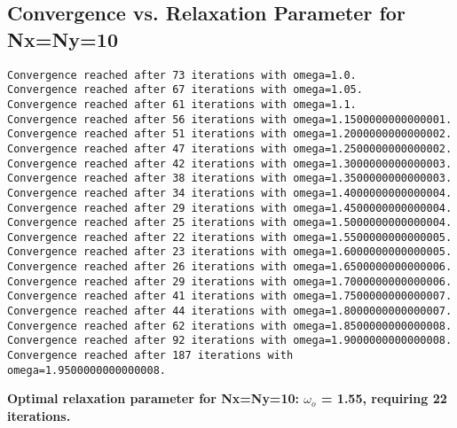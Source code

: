 \documentclass[a4paper, twoside]{article}
\begin{document}
\subsection{Convergence vs. Relaxation Parameter for Nx=Ny=10}
\begin{lstlisting}
Convergence reached after 73 iterations with omega=1.0.
Convergence reached after 67 iterations with omega=1.05.
Convergence reached after 61 iterations with omega=1.1.
Convergence reached after 56 iterations with omega=1.1500000000000001.
Convergence reached after 51 iterations with omega=1.2000000000000002.
Convergence reached after 47 iterations with omega=1.2500000000000002.
Convergence reached after 42 iterations with omega=1.3000000000000003.
Convergence reached after 38 iterations with omega=1.3500000000000003.
Convergence reached after 34 iterations with omega=1.4000000000000004.
Convergence reached after 29 iterations with omega=1.4500000000000004.
Convergence reached after 25 iterations with omega=1.5000000000000004.
Convergence reached after 22 iterations with omega=1.5500000000000005.
Convergence reached after 23 iterations with omega=1.6000000000000005.
Convergence reached after 26 iterations with omega=1.6500000000000006.
Convergence reached after 29 iterations with omega=1.7000000000000006.
Convergence reached after 41 iterations with omega=1.7500000000000007.
Convergence reached after 44 iterations with omega=1.8000000000000007.
Convergence reached after 62 iterations with omega=1.8500000000000008.
Convergence reached after 92 iterations with omega=1.9000000000000008.
Convergence reached after 187 iterations with omega=1.9500000000000008.
\end{lstlisting}

\textbf{Optimal relaxation parameter for Nx=Ny=10: $\omega_o$ = 1.55, requiring 22 iterations.}
\end{document}
